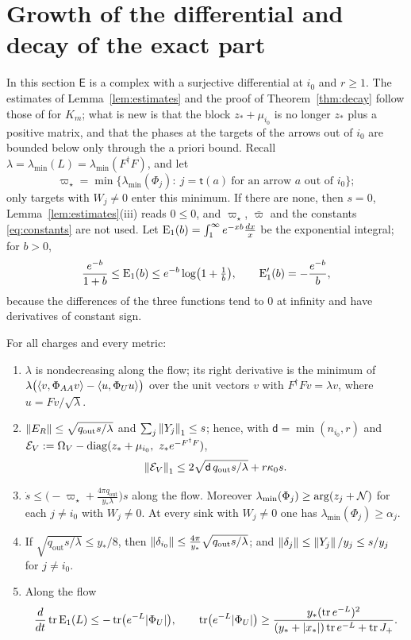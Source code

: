 \section{Growth of the differential and decay of the exact part}\label{sec:decay}

In this section $\mathsf E$ is a complex with a surjective differential at
$i_0$ and $r\geq1$. The estimates of Lemma~\ref{lem:estimates} and the proof
of Theorem~\ref{thm:decay} follow those of \cite{wue26b} for $K_m$; what is
new is that the block $z_\ast+\mu_{i_0}$ is no longer $z_\ast$ plus a
positive matrix, and that the phases at the targets of the arrows out of
$i_0$ are bounded below only through the a priori bound. Recall $\lambda=\lambda_{\min}(L)=\lambda_{\min}(F^\dagger F)$, and
let
\[
 \varpi_\star=\min\bigl\{\lambda_{\min}(\Phi_j):\ j=\mathsf t(a)\ \text{for an arrow }a\text{ out of }i_0\bigr\};
\]
only targets with $W_j\neq0$ enter this minimum. If there are none,
then $s=0$, Lemma~\ref{lem:estimates}(iii) reads
$0\leq0$, and $\varpi_\star$, $\bar\varpi$ and the constants
\eqref{eq:constants} are not used.
Let $\mathrm E_1(b)=\int_1^\infty e^{-xb}\frac{dx}x$ be the exponential integral;
for $b>0$,
\begin{equation}\label{eq:E1}
 \frac{e^{-b}}{1+b}\leq\mathrm E_1(b)\leq e^{-b}\log\bigl(1+\tfrac1b\bigr),\qquad
 \mathrm E_1'(b)=-\frac{e^{-b}}b ,
\end{equation}
because the differences of the three functions tend to $0$ at infinity and
have derivatives of constant sign.

\begin{lemma}\label{lem:estimates}
For all charges and every metric:
\begin{enumerate}
\item[(i)] $\lambda$ is nondecreasing along the flow; its right derivative is
 the minimum of
 $\lambda\bigl(\left\langle v,\Phi_{AA}v\right\rangle-\left\langle u,\Phi_Uu\right\rangle\bigr)$ over the unit
 vectors $v$ with $F^\dagger Fv=\lambda v$, where $u=Fv/\sqrt\lambda$.
\item[(ii)] $\left\lVert E_R\right\rVert\leq\sqrt{q_{\mathrm{out}}s/\lambda}$ and
 $\sum_j\left\lVert Y_j\right\rVert_1\leq s$; hence, with $\mathsf d=\min(n_{i_0},r)$ and
 $\mathcal E_V:=\Omega_V-\operatorname{diag}(z_\ast+\mu_{i_0},\ z_\ast e^{-F^\dagger F})$,
 \[
 \left\lVert\mathcal E_V\right\rVert_1\leq2\sqrt{\mathsf d\,q_{\mathrm{out}}s/\lambda}+r\kappa_0s .
 \]
\item[(iii)] $\dot s\leq\bigl(-\varpi_\star+\frac{4\pi q_{\mathrm{out}}}{y_\ast\lambda}\bigr)s$
 along the flow. Moreover $\lambda_{\min}(\Phi_j)\geq\arg(z_j+\mathcal N)$ for
 each $j\neq i_0$ with $W_j\neq 0$. At every sink with $W_j\neq 0$ one has $\lambda_{\min}(\Phi_j)\geq\alpha_j$.
\item[(iv)] If $\sqrt{q_{\mathrm{out}}s/\lambda}\leq y_\ast/8$, then
 $\left\lVert\delta_{i_0}\right\rVert\leq\frac{4\pi}{y_\ast}\sqrt{q_{\mathrm{out}}s/\lambda}$;
 and $\left\lVert\delta_j\right\rVert\leq\left\lVert Y_j\right\rVert/y_j\leq s/y_j$ for $j\neq i_0$.
\item[(v)] Along the flow
 \[
 \frac d{dt}\operatorname{tr}\mathrm E_1(L)\leq-\operatorname{tr}\bigl(e^{-L}|\Phi_U|\bigr),\qquad
 \operatorname{tr}\bigl(e^{-L}|\Phi_U|\bigr)\geq
 \frac{y_\ast(\operatorname{tr} e^{-L})^2}{(y_\ast+|x_\ast|)\operatorname{tr} e^{-L}+\operatorname{tr} J_+} .
 \]
\end{enumerate}
\end{lemma}

